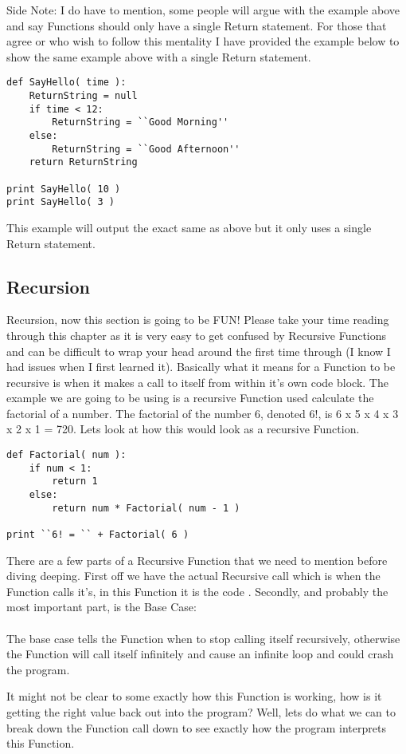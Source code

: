 Side Note: I do have to mention, some people will argue with the example above and say Functions should only have a single Return statement.
For those that agree or who wish to follow this mentality I have provided the example below to show the same example above with a single Return
statement.

\begin{lstlisting}[caption={Single Return Statement}]
def SayHello( time ):
    ReturnString = null
    if time < 12:
        ReturnString = ``Good Morning''
    else:
        ReturnString = ``Good Afternoon''
    return ReturnString

print SayHello( 10 )
print SayHello( 3 )
\end{lstlisting}

This example will output the exact same as above but it only uses a single Return statement.

\subsection{Recursion}
Recursion, now this section is going to be FUN!
Please take your time reading through this chapter as it is very easy to get confused by Recursive Functions and can be difficult to wrap
your head around the first time through (I know I had issues when I first learned it).
Basically what it means for a Function to be recursive is when it makes a call to itself from within it's own code block.
The example we are going to be using is a recursive Function used calculate the factorial of a number.
The factorial of the number 6, denoted 6!, is 6 x 5 x 4 x 3 x 2 x 1 = 720.
Lets look at how this would look as a recursive Function.

\begin{lstlisting}[caption={Recursive Factorial}]
def Factorial( num ):
    if num < 1:
        return 1
    else:
        return num * Factorial( num - 1 )

print ``6! = `` + Factorial( 6 )
\end{lstlisting}

There are a few parts of a Recursive Function that we need to mention before diving deeping.
First off we have the actual Recursive call which is when the Function calls it's, in this Function it is
the code .
Secondly, and probably the most important part, is the Base Case:\\
\\
The base case tells the Function when to stop calling itself recursively, otherwise the Function will call itself
infinitely and cause an infinite loop and could crash the program.
\par

It might not be clear to some exactly how this Function is working, how is it getting the right value back out into
the program?
Well, lets do what we can to break down the Function call  down to see exactly how the program
interprets this Function.
